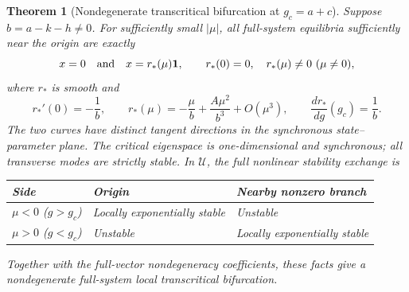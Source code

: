 \documentclass[11pt]{article}
\newcommand{\one}{\mathbf{1}}
\newcommand{\Domain}{\mathcal{U}}
\newtheorem{theorem}{Theorem}[section]
\theoremstyle{definition}
\theoremstyle{remark}
\begin{document}
\begin{theorem}[Nondegenerate transcritical bifurcation at $g_c=a+c$]
\label{thm:P09-transcritical}
Suppose $b=a-k-h\ne0$. For sufficiently small $|\mu|$, all full-system
equilibria sufficiently near the origin are exactly
\begin{equation}
 x=0\quad\hbox{and}\quad x=r_*(\mu)\one,\qquad
 r_*(0)=0,\quad r_*(\mu)\ne0\ (\mu\ne0),
 \label{eq:P09-branches}
\end{equation}
where $r_*$ is smooth and
\begin{equation}
 r_*'(0)=-\frac1b,\qquad
 r_*(\mu)=-\frac\mu b+\frac{A\mu^2}{b^3}+O(\mu^3),\qquad
 \frac{dr_*}{dg}(g_c)=\frac1b.
 \label{eq:P09-slopes}
\end{equation}
The two curves have distinct tangent directions in the synchronous
state--parameter plane. The critical eigenspace is one-dimensional and
synchronous; all transverse modes are strictly stable. In $\Domain$,
the full nonlinear stability exchange is
\begin{center}
\begin{tabular}{@{}lll@{}}
\toprule
Side & Origin & Nearby nonzero branch\\
\midrule
$\mu<0$ ($g>g_c$) & Locally exponentially stable & Unstable\\
$\mu>0$ ($g<g_c$) & Unstable & Locally exponentially stable\\
\bottomrule
\end{tabular}
\end{center}
Together with the full-vector nondegeneracy coefficients, these facts
give a nondegenerate full-system local transcritical bifurcation.
\end{theorem}
\end{document}

